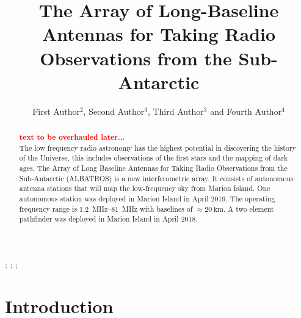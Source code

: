 \documentclass{ws-jai}
\begin{document}
\catchline{}{}{}{}{} %


\title{The Array of Long-Baseline Antennas for Taking Radio
  Observations from the Sub-Antarctic}

\author{First Author$^{2}$, Second Author$^{3}$, Third Author$^{3}$ and Fourth Author$^{4}$}

\address{
$^{2}$Department, University Name, City, State ZIP/Zone, Country, fauthor@university.com\\
$^{3}$Group, Company, Address, City, State ZIP/Zone, Country\\
$^{4}$Group, Company, Address, City, State ZIP/Zone, Country, fauthor@company.com
}

\maketitle


\begin{history}
;
;
;
\end{history}

\begin{abstract}
\textcolor{red}{\bf text to be overhauled later...} \\
The low frequency radio astronomy has the highest potential in
discovering the history of the Universe, this includes observations
of the first stars and the mapping of dark ages. The Array of Long
Baseline Antennas for Taking Radio Observations from the
Sub-Antarctic (ALBATROS) is a new interferometric array. It consists
of autonomous antenna stations that will map the low-frequency sky
from Marion Island. One autonomous station was deployed in Marion
Island in April 2019. The operating frequency range is
\SIrange{1.2}{81}{\MHz} with baselines of $\approx \SI{20}{\km}$. A
two element pathfinder was deployed in Marion Island in April
2018.
\end{abstract}


\section{Introduction}
\end{document}
